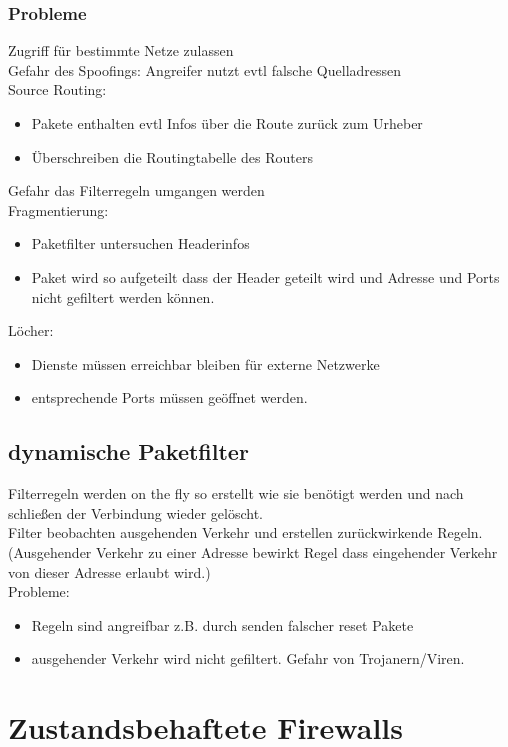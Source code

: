 \documentclass{article} %
\begin{document}
\subsubsection{Probleme}
Zugriff für bestimmte Netze zulassen\\
Gefahr des Spoofings: Angreifer nutzt evtl falsche Quelladressen\\
Source Routing: 
\begin{itemize}
	\item Pakete enthalten evtl Infos über die Route zurück zum Urheber
    \item Überschreiben die Routingtabelle des Routers
\end{itemize}
Gefahr das Filterregeln umgangen werden\\
Fragmentierung:
\begin{itemize}
	\item Paketfilter untersuchen Headerinfos
    \item Paket wird so aufgeteilt dass der Header geteilt wird und Adresse und Ports nicht gefiltert werden können.
\end{itemize}
Löcher:
\begin{itemize}
	\item Dienste müssen erreichbar bleiben für externe Netzwerke
    \item entsprechende Ports müssen geöffnet werden.
\end{itemize}
\subsection{dynamische Paketfilter}
Filterregeln werden on the fly so erstellt wie sie benötigt werden und nach schließen der Verbindung wieder gelöscht.\\
Filter beobachten ausgehenden Verkehr und erstellen zurückwirkende Regeln.(Ausgehender Verkehr zu einer Adresse bewirkt Regel dass eingehender Verkehr von dieser Adresse erlaubt wird.)\\
Probleme: 
\begin{itemize}
	\item Regeln sind angreifbar z.B. durch senden falscher reset Pakete
    \item ausgehender Verkehr wird nicht gefiltert. Gefahr von Trojanern/Viren.
\end{itemize}


\section{Zustandsbehaftete Firewalls}
\end{document}
